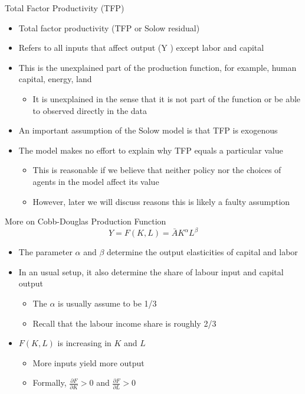 \documentclass[aspectratio=1610]{beamer}
\begin{document}
\begin{frame}[wide]{Total Factor Productivity (TFP)}
	\begin{itemize}
		\item Total factor productivity (TFP or Solow residual)
		\item Refers to all inputs that affect output (Y ) except labor and capital
		\item This is the unexplained part of the production function, for example, human capital, energy, land
		\begin{itemize}
			\item It is unexplained in the sense that it is not part of the function or be able to observed directly in the data
		\end{itemize}
		\item An important assumption of the Solow model is that TFP is exogenous
		\item The model makes no effort to explain why TFP equals a particular value
		\begin{itemize}
			\item This is reasonable if we believe that neither policy nor the choices of agents in the model affect its value
			\item However, later we will discuss reasons this is likely a faulty assumption
		\end{itemize}
	\end{itemize}
\end{frame}

\begin{frame}[wide]{More on Cobb-Douglas Production Function}
	\[Y=F(K,L) = \bar{A} K^{\alpha}L^{\beta}\]
	\begin{itemize}
		\item The parameter $\alpha$ and $\beta$ determine the output elasticities of capital and labor
		\item In an usual setup, it also determine the share of labour input and capital output
		\begin{itemize}
			\item The $\alpha$ is usually assume to be 1/3
			\item Recall that the labour income share is roughly 2/3
		\end{itemize}
		\item $F(K,L)$ is increasing in $K$ and $L$
		\begin{itemize}
			\item More inputs yield more output
			\item Formally, $\frac{\partial F}{\partial K} >0 $ and $\frac{\partial F}{\partial L}>0$
		\end{itemize}
	\end{itemize}
\end{frame}
\end{document}
